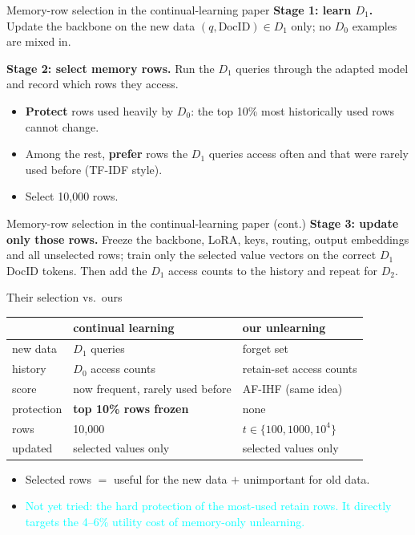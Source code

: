 \documentclass{beamer}
\newcommand{\pierre}[1]{\textcolor{cyan}{#1}}
\begin{document}
\begin{frame}{Memory-row selection in the continual-learning paper}
\textbf{Stage 1: learn $D_1$.} Update the backbone on the new data
$(q, \text{DocID}) \in D_1$ only; no $D_0$ examples are mixed in.

\medskip
\textbf{Stage 2: select memory rows.} Run the $D_1$ queries through the adapted
model and record which rows they access.
\begin{itemize}
  \item \textbf{Protect} rows used heavily by $D_0$: the top 10\% most
        historically used rows cannot change.
  \item Among the rest, \textbf{prefer} rows the $D_1$ queries access often and
        that were rarely used before (TF-IDF style).
  \item Select 10{,}000 rows.
\end{itemize}

\end{frame}

\begin{frame}{Memory-row selection in the continual-learning paper (cont.)}
\textbf{Stage 3: update only those rows.} Freeze the backbone, LoRA, keys,
routing, output embeddings and all unselected rows; train only the selected
value vectors on the correct $D_1$ DocID tokens. Then add the $D_1$ access
counts to the history and repeat for $D_2$.
\end{frame}

\begin{frame}{Their selection vs.\ ours}
\begin{center}
\small
\begin{tabular}{|l|l|l|}
\hline
 & continual learning & our unlearning \\
\hline
new data      & $D_1$ queries          & forget set \\
history       & $D_0$ access counts    & retain-set access counts \\
score         & now frequent, rarely used before & AF-IHF (same idea) \\
protection    & \textbf{top 10\% rows frozen} & none \\
rows          & 10{,}000               & $t \in \{100, 1000, 10^4\}$ \\
updated       & selected values only   & selected values only \\
\hline
\end{tabular}
\end{center}

\medskip
\begin{itemize}
  \item Selected rows $=$ useful for the new data $+$ unimportant for old data.
  \item \pierre{Not yet tried: the hard protection of the most-used retain
        rows. It directly targets the 4--6\% utility cost of memory-only
        unlearning.}
\end{itemize}
\end{frame}
\end{document}
